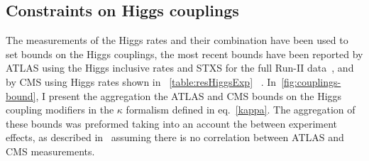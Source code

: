\subsection{Constraints on Higgs couplings}
The measurements of the Higgs rates and their combination have been used to set bounds on the Higgs couplings, the most recent bounds have been reported by ATLAS using the Higgs inclusive rates and STXS for the full Run-II data~\cite{ATLAS2021vrm}, and  by CMS using Higgs rates shown in ~\autoref{table:resHiggsExp} ~\cite{CMS:2020gsy}. In~\autoref{fig:couplings-bound}, I present the aggregation the ATLAS and CMS bounds on the Higgs coupling modifiers in the $\kappa$ formalism defined in eq.~\eqref{kappa}. The aggregation of these bounds was preformed
taking into an account the between experiment effects, as described in~\cite{30688c22e51b409197a8639f2a496516} assuming there is no correlation between ATLAS and CMS measurements.  
